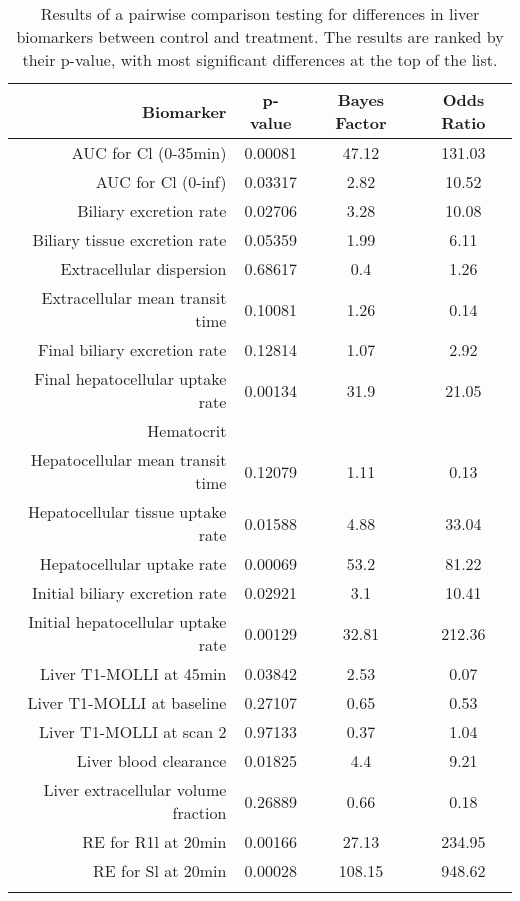 \documentclass{epflreport}%
\begin{document}
%
\begin{longtable}{rccc}%
\hline%
Biomarker&p{-}value&Bayes Factor&Odds Ratio\\%
\hline%
AUC for Cl (0{-}35min)&0.00081&47.12&131.03\\%
AUC for Cl (0{-}inf)&0.03317&2.82&10.52\\%
Biliary excretion rate&0.02706&3.28&10.08\\%
Biliary tissue excretion rate&0.05359&1.99&6.11\\%
Extracellular dispersion&0.68617&0.4&1.26\\%
Extracellular mean transit time&0.10081&1.26&0.14\\%
Final biliary excretion rate&0.12814&1.07&2.92\\%
Final hepatocellular uptake rate&0.00134&31.9&21.05\\%
Hematocrit&&&\\%
Hepatocellular mean transit time&0.12079&1.11&0.13\\%
Hepatocellular tissue uptake rate&0.01588&4.88&33.04\\%
Hepatocellular uptake rate&0.00069&53.2&81.22\\%
Initial biliary excretion rate&0.02921&3.1&10.41\\%
Initial hepatocellular uptake rate&0.00129&32.81&212.36\\%
Liver T1{-}MOLLI at 45min&0.03842&2.53&0.07\\%
Liver T1{-}MOLLI at baseline&0.27107&0.65&0.53\\%
Liver T1{-}MOLLI at scan 2&0.97133&0.37&1.04\\%
Liver blood clearance&0.01825&4.4&9.21\\%
Liver extracellular volume fraction&0.26889&0.66&0.18\\%
RE for R1l at 20min&0.00166&27.13&234.95\\%
RE for Sl at 20min&0.00028&108.15&948.62\\%
\hline%
\caption{Results of a pairwise comparison testing for differences in liver biomarkers between control and treatment. The results are ranked by their p-value, with most significant differences at the top of the list.} \\%
\end{longtable}%
\end{document}
